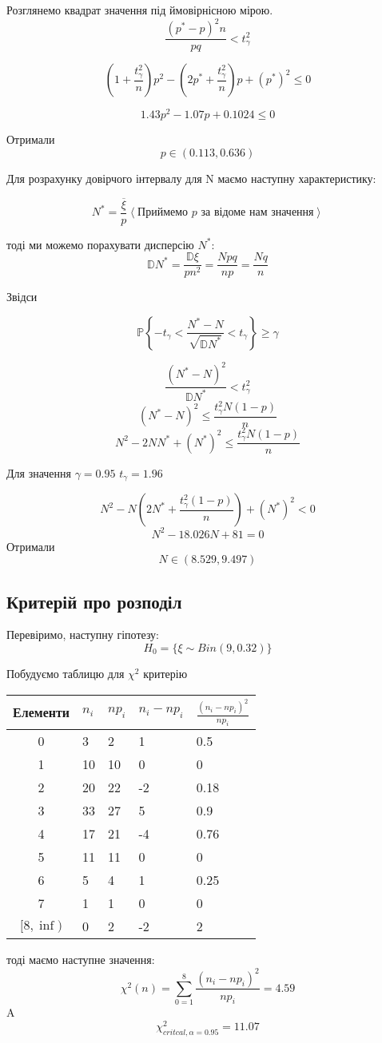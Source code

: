 \documentclass{article}
\begin{document}
Розглянемо квадрат значення під ймовірнісною мірою.
$$
\frac{ ( p^* - p)^2  n } {pq} < t_\gamma^2
$$

$$
\left(1 + \frac{t_\gamma^2}{n} \right) p^2 - \left( 2 p^* + \frac{t_\gamma^2}{n}\right) p + (p^*)^2
\leq 0
$$

$$
1.43p^2 - 1.07p + 0.1024 \leq 0
$$

Отримали
$$
p \in \left(0.113, 0.636  \right)
$$

Для розрахунку довірчого інтервалу для N маємо наступну характеристику:

$$
N^* = \frac{\overline\xi}{p} \left< \textrm{Приймемо } p \textrm{ за відоме нам значення} \right>
$$

тоді ми можемо порахувати дисперсію $N^*$:
$$
\mathbb{D}N^* = \frac{ \mathbb{D}\xi}{pn^2} = \frac{ Npq}{np} = \frac{Nq}{n}
$$

Звідси 

$$
\mathbb{P} \left\{ -t_\gamma < \frac{N^* - N}{\sqrt{\mathbb{D}N^*}} < t_\gamma \right\} \geq \gamma 
$$

$$
\frac{(N^* - N)^2}{\mathbb{D}N^*} < t_\gamma^2  
$$
$$
(N^* - N)^2 \leq \frac{t_\gamma^2 N(1-p)}{n}
$$
$$
N^2 - 2N N^* + (N^*)^2 \leq \frac{t_\gamma^2 N(1-p)}{n}
$$

Для значення $\gamma=0.95$ $t_\gamma = 1.96$  

$$
N^2 - N \left( 2N^* + \frac{t_\gamma^2(1-p)}{n} \right) + (N^*)^2 < 0
$$
$$
N^2 - 18.026N + 81 = 0
$$
Отримали
\[
    N \in \left( 8.529, 9.497\right) 
\]

\subsection{Критерій про розподіл}
Перевіримо, наступну гіпотезу:
$$
H_0= \{\xi \sim Bin(9, 0.32)\}
$$

Побудуємо таблицю для $\chi^2$ критерію
\begin{center}
\begin{tabular}{|c||m{2cm}|m{2cm}|m{2cm}|m{2cm}|}
    \hline
    Елементи & $n_i$ & $np_i$ & $n_i - np_i$ & $\frac{(n_i - np_i)^2}{np_i}$ \\
    \hline
    \hline
    0 & 3 & 2 & 1 & 0.5 \\
    \hline
    1 & 10 & 10 & 0 & 0 \\
    \hline
    2 & 20 & 22 & -2 & 0.18 \\
    \hline
    3 & 33 & 27 & 5 & 0.9 \\
    \hline
    4 & 17 & 21 & -4 & 0.76 \\
    \hline
    5 & 11 & 11 & 0 & 0 \\
    \hline
    6 & 5  & 4  & 1 & 0.25 \\
    \hline
    7 & 1  & 1  & 0 & 0 \\
    \hline
    $[8, \inf)$ & 0 & 2 & -2 & 2 \\
    \hline
\end{tabular}
\end{center}
тоді маємо наступне значення:
$$
\chi^2(n)=\sum_{0=1}^{8} \frac{(n_i - np_i)^2}{np_i} = 4.59
$$
A
$$
\chi_{critcal, \alpha=0.95}^2 = 11.07   
$$
\end{document}
